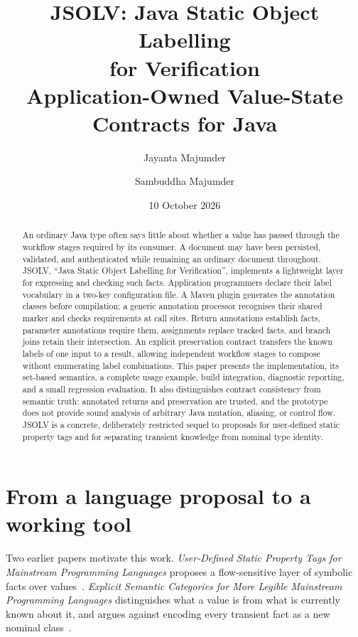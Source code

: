 \documentclass[11pt]{article}
\title{JSOLV: Java Static Object Labelling\\for Verification\\
Application-Owned Value-State Contracts for Java}
\author{Jayanta Majumder \and Sambuddha Majumder}
\date{10 October 2026}
\begin{document}
\maketitle

\begin{abstract}
An ordinary Java type often says little about whether a value has passed through
the workflow stages required by its consumer. A document may have been persisted,
validated, and authenticated while remaining an ordinary document throughout.
JSOLV, ``Java Static Object Labelling for Verification'', implements a lightweight layer
for expressing and checking such facts. Application programmers declare their
label vocabulary in a two-key configuration file. A Maven plugin generates the
annotation classes before compilation; a generic annotation processor recognises
their shared marker and checks requirements at call sites. Return annotations
establish facts, parameter annotations require them, assignments replace tracked
facts, and branch joins retain their intersection. An explicit preservation
contract transfers the known labels of one input to a result, allowing independent
workflow stages to compose without enumerating label combinations. This paper
presents the implementation, its set-based semantics, a complete usage example,
build integration, diagnostic reporting, and a small regression evaluation. It
also distinguishes contract consistency from semantic truth: annotated returns
and preservation are trusted, and the prototype does not provide sound analysis
of arbitrary Java mutation, aliasing, or control flow. JSOLV is a concrete,
deliberately restricted sequel to proposals for user-defined static property tags
and for separating transient knowledge from nominal type identity.
\end{abstract}

\section{From a language proposal to a working tool}

Two earlier papers motivate this work. \emph{User-Defined Static Property Tags
for Mainstream Programming Languages} proposes a flow-sensitive layer of symbolic
facts over values~\cite{property-tags}. \emph{Explicit Semantic Categories for
More Legible Mainstream Programming Languages} distinguishes what a value is from
what is currently known about it, and argues against encoding every transient
fact as a new nominal class~\cite{semantic-categories}.
\end{document}
